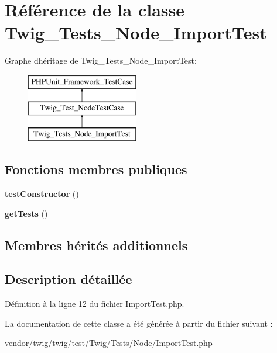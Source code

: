 \hypertarget{class_twig___tests___node___import_test}{}\section{Référence de la classe Twig\+\_\+\+Tests\+\_\+\+Node\+\_\+\+Import\+Test}
\label{class_twig___tests___node___import_test}
Graphe d\textquotesingle{}héritage de Twig\+\_\+\+Tests\+\_\+\+Node\+\_\+\+Import\+Test\+:\begin{figure}[H]
\begin{center}
\leavevmode
\includegraphics[height=3.000000cm]{class_twig___tests___node___import_test}
\end{center}
\end{figure}
\subsection*{Fonctions membres publiques}
\begin{DoxyCompactItemize}
\item 
{\bfseries test\+Constructor} ()\hypertarget{class_twig___tests___node___import_test_a47094dc941e72950570900d1418f89c6}{}\label{class_twig___tests___node___import_test_a47094dc941e72950570900d1418f89c6}

\item 
{\bfseries get\+Tests} ()\hypertarget{class_twig___tests___node___import_test_a7e247dd31cc8d37a6c97353a062a0080}{}\label{class_twig___tests___node___import_test_a7e247dd31cc8d37a6c97353a062a0080}

\end{DoxyCompactItemize}
\subsection*{Membres hérités additionnels}


\subsection{Description détaillée}


Définition à la ligne 12 du fichier Import\+Test.\+php.



La documentation de cette classe a été générée à partir du fichier suivant \+:\begin{DoxyCompactItemize}
\item 
vendor/twig/twig/test/\+Twig/\+Tests/\+Node/Import\+Test.\+php\end{DoxyCompactItemize}
